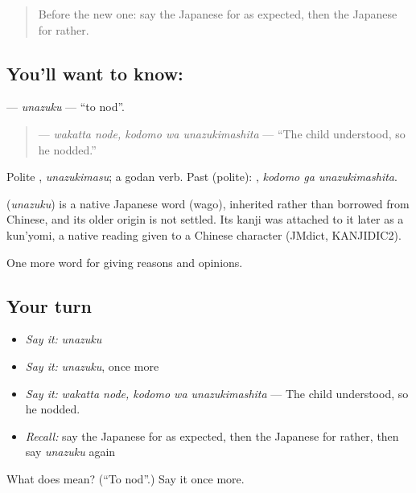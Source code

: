 \label{lesson:JA-C321-unazuku}



\begin{quote}
Before the new one: say the Japanese for as expected, then the Japanese for rather.
\end{quote}

\subsection*{You'll want to know: }
\textbf{} — \emph{unazuku} — \textquotedblleft{}to nod\textquotedblright{}.

\begin{quote}
\textbf{ } — \emph{wakatta node, kodomo wa unazukimashita} — \textquotedblleft{}The child understood, so he nodded.\textquotedblright{}
\end{quote}

Polite \textbf{}, \emph{unazukimasu}; a godan verb. Past (polite): \textbf{ }, \emph{kodomo ga unazukimashita}.

\begin{cousinweb}
\textbf{} (\emph{unazuku}) is a native Japanese word (wago), inherited rather than borrowed from Chinese, and its older origin is not settled. Its kanji was attached to it later as a kun'yomi, a native reading given to a Chinese character (JMdict, KANJIDIC2).
\end{cousinweb}

\begin{grammarlens}[title={What you've built}]
One more word for giving reasons and opinions.
\end{grammarlens}

\subsection*{Your turn}
\begin{itemize}
\raggedright
  \item \emph{Say it:} \emph{unazuku}
  \item \emph{Say it:} \emph{unazuku}, once more
  \item \emph{Say it:} \emph{wakatta node, kodomo wa unazukimashita} — The child understood, so he nodded.
  \item \emph{Recall:} say the Japanese for as expected, then the Japanese for rather, then say \emph{unazuku} again
\end{itemize}

\begin{tcolorbox}[breakable,colback=teal!4,colframe=teal!35!black,title={Before you move on}]
What does  mean? (\textquotedblleft{}To nod\textquotedblright{}.) Say it once more.
\end{tcolorbox}
